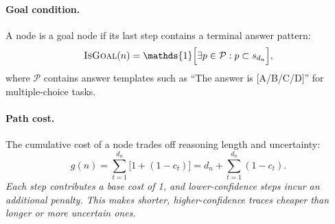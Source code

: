 \documentclass[10pt]{article}
\begin{document}
\paragraph{Goal condition.}
A node is a goal node if its last step contains a terminal answer pattern:
\begin{equation}
\textsc{IsGoal}(n) = \mathds{1}\Big[\exists p \in \mathcal{P}: p \subset s_{d_n}\Big],
\label{eq:isgoal}
\end{equation}
where $\mathcal{P}$ contains answer templates such as ``The answer is [A/B/C/D]'' for multiple-choice tasks.

\paragraph{Path cost.}
The cumulative cost of a node trades off reasoning length and uncertainty:
\begin{equation}
g(n) = \sum_{t=1}^{d_n} \big[1 + (1-c_t)\big]
    = d_n + \sum_{t=1}^{d_n}(1-c_t).
\label{eq:gcost}
\end{equation}
\textit{Each step contributes a base cost of 1, and lower-confidence steps incur an additional penalty. This makes shorter, higher-confidence traces cheaper than longer or more uncertain ones.}





\end{document}
